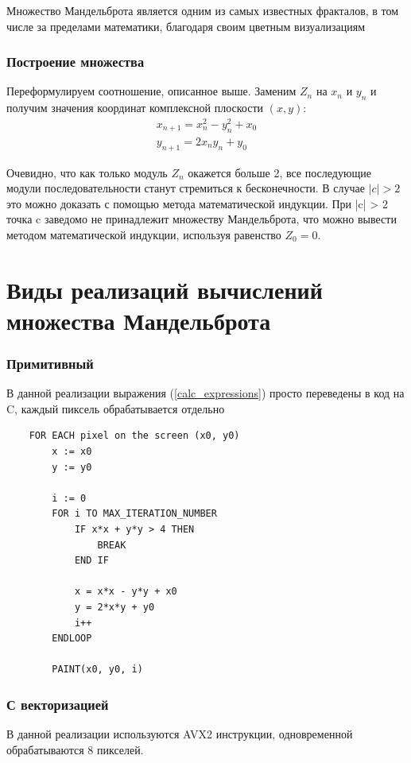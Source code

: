 \documentclass[a4paper, 12pt]{article}
\begin{document}
Множество Мандельброта является одним из самых известных фракталов, в том числе за пределами математики, благодаря своим цветным визуализациям
\subsubsection*{Построение множества}
Переформулируем соотношение, описанное выше. Заменим $Z_n$ на $x_n$ и $y_n$ и получим значения координат комплексной плоскости $(x, y)$:
\begin{align} 
    x_{n+1} = x_n^2 - y_n^2 + x_0 \nonumber\\
    y_{n+1} = 2x_ny_n + y_0 \label{calc_expressions}
\end{align}

Очевидно, что как только модуль $Z_n$ окажется больше 2, все последующие модули последовательности станут стремиться к бесконечности. В случае $|c| > 2$ это можно доказать с помощью метода математической индукции. При |c| > 2 точка c заведомо не принадлежит множеству Мандельброта, что можно вывести методом математической индукции, используя равенство $Z_0 = 0$.
\newpage

\section*{Виды реализаций вычислений множества Мандельброта}
\subsubsection*{Примитивный}
В данной реализации выражения (\ref{calc_expressions}) просто переведены в код на C, каждый пиксель обрабатывается отдельно

\begin{lstlisting}
    FOR EACH pixel on the screen (x0, y0)
        x := x0
        y := y0
    
        i := 0
        FOR i TO MAX_ITERATION_NUMBER
            IF x*x + y*y > 4 THEN
                BREAK
            END IF
    
            x = x*x - y*y + x0
            y = 2*x*y + y0
            i++
        ENDLOOP
        
        PAINT(x0, y0, i)
\end{lstlisting}
\subsubsection*{С векторизацией}
В данной реализации используются AVX2 инструкции, одновременной обрабатываются 8 пикселей.
\end{document}
